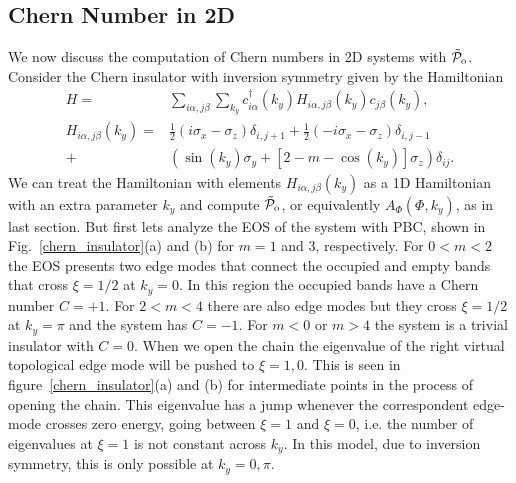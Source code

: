\documentclass[twocolumn,amsmath,longbibliography,amssymb,superscriptaddress]{revtex4-1}
\newcommand{\tpo}{\tilde{\mathcal{P}}_{\rm o}}
\begin{document}
\subsection{Chern Number in 2D}
%
We now discuss  the computation of Chern numbers in 2D systems with $\tpo$. Consider the Chern insulator with inversion symmetry given by the Hamiltonian
\begin{align}
H =& \sum_{i\alpha,j\beta}\sum_{k_y} c_{i\alpha}^\dagger(k_y) H_{i\alpha,j\beta}(k_y) c_{j\beta}(k_y), \\
H_{i\alpha,j\beta}(k_y)=& \frac{1}{2}(i\sigma_x-\sigma_z)\delta_{i,j+1}+\frac{1}{2}(-i\sigma_x-\sigma_z)\delta_{i,j-1} \nonumber\\
+&(\sin(k_y)\sigma_y+[2-m-\cos(k_y)]\sigma_z) \delta_{ij}.
\end{align}
We can treat the Hamiltonian with elements $H_{i\alpha,j\beta}(k_y)$ as a 1D Hamiltonian with an extra parameter $k_y$ and compute $\tpo$, or equivalently $A_\Phi(\Phi,k_y)$, as in last section. But first lets analyze the EOS of the system with PBC, shown in Fig.~\ref{chern_insulator}(a) and (b) for $m=1$ and $3$, respectively. For $0<m<2$ the EOS presents two edge modes that connect the occupied and empty bands that cross $\xi=1/2$ at $k_y=0$. In this region the occupied bands have a Chern number $C=+1$. For $2<m<4$ there are also edge modes but they cross $\xi=1/2$ at $k_y=\pi$ and the system has $C=-1$. For $m<0$ or $m>4$ the system is a trivial insulator with $C=0$. When we open the chain the eigenvalue of the right virtual topological edge mode will be pushed to $\xi=1,0$. This is seen in figure~\ref{chern_insulator}(a) and (b) for intermediate points in the process of opening the chain. This eigenvalue has a jump whenever the correspondent edge-mode crosses zero energy, going between $\xi=1$ and $\xi=0$, i.e. the number of eigenvalues at $\xi = 1$ is not constant across $k_y$. In this model, due to inversion symmetry, this is only possible at $k_y=0,\pi$. 
\end{document}
